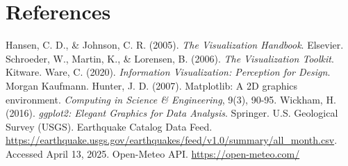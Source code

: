 \documentclass[11pt]{article}
\begin{document}
	\section{References}
	
	\begin{thebibliography}{9}
		 Hansen, C. D., \& Johnson, C. R. (2005). \textit{The Visualization Handbook}. Elsevier.
		 Schroeder, W., Martin, K., \& Lorensen, B. (2006). \textit{The Visualization Toolkit}. Kitware.
		 Ware, C. (2020). \textit{Information Visualization: Perception for Design}. Morgan Kaufmann.
		 Hunter, J. D. (2007). Matplotlib: A 2D graphics environment. \textit{Computing in Science \& Engineering}, 9(3), 90-95.
		 Wickham, H. (2016). \textit{ggplot2: Elegant Graphics for Data Analysis}. Springer.
		U.S. Geological Survey (USGS). Earthquake Catalog Data Feed. \url{https://earthquake.usgs.gov/earthquakes/feed/v1.0/summary/all_month.csv}. Accessed April 13, 2025.
		 Open-Meteo API. \url{https://open-meteo.com/}
		
	\end{thebibliography}
	
\end{document}
